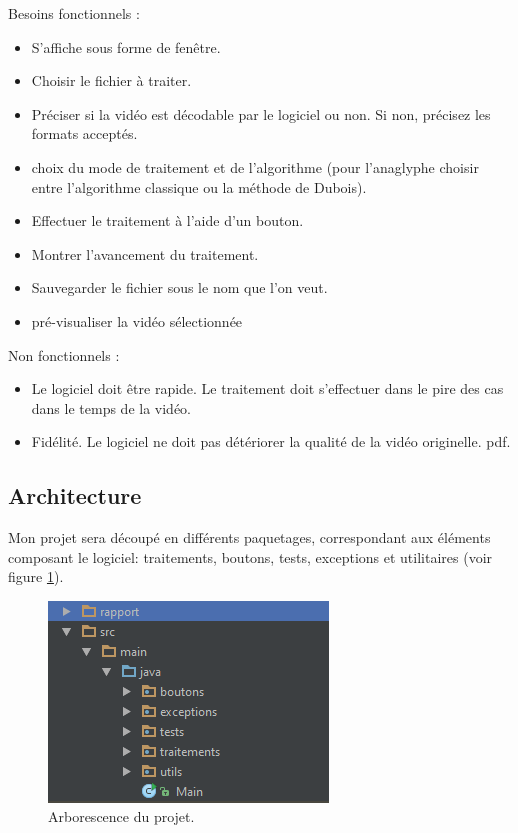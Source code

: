 \documentclass[10pt,a4paper]{article}
\begin{document}
Besoins fonctionnels :\newline
\begin{itemize}
\item S'affiche sous forme de fenêtre.
\item Choisir le fichier à traiter.
\item Préciser si la vidéo est décodable par le logiciel ou non. Si non, précisez les formats acceptés.
\item choix du mode de traitement et de l'algorithme (pour l'anaglyphe choisir entre l'algorithme classique ou la méthode
de Dubois).
\item Effectuer le traitement à l'aide d'un bouton.
\item Montrer l'avancement du traitement.
\item Sauvegarder le fichier sous le nom que l'on veut.
\item pré-visualiser la vidéo sélectionnée\newline
\end{itemize}

Non fonctionnels :\newline
\begin{itemize}
\item Le logiciel doit être rapide. Le traitement doit s'effectuer dans le pire des cas dans le temps de la vidéo.
\item Fidélité. Le logiciel ne doit pas détériorer la qualité de la vidéo originelle.
pdf.\newline
\end{itemize}

\subsection{Architecture}

Mon projet sera découpé en différents paquetages, correspondant aux éléments composant le logiciel: traitements, boutons, tests, exceptions et utilitaires (voir figure \ref{arbo}).

\begin{figure}[!h]
\center
\includegraphics[scale = 1]{tree.PNG}
\caption{Arborescence du projet.}
\label{arbo}
\end{figure}
\end{document}
